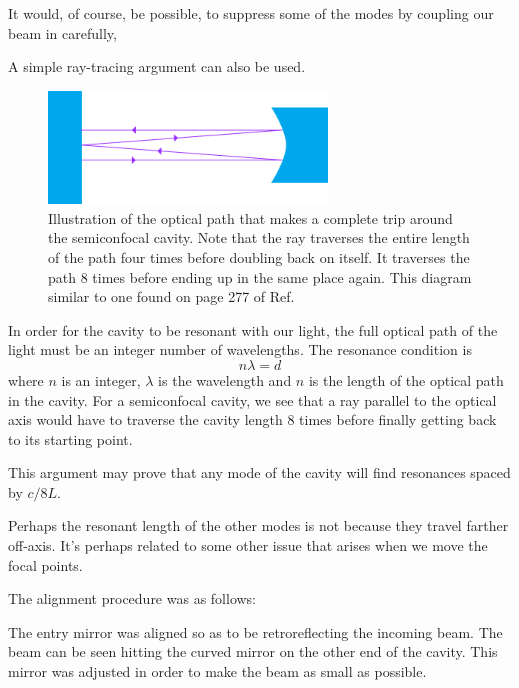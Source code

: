 It would, of course, be possible, to suppress some of the modes by coupling our beam in carefully, 

A simple ray-tracing argument can also be used. 
\begin{figure}
\centerline{\includegraphics[height=3cm]{spectrum_analyzer_path.png}}
\caption{Illustration of the optical path that makes a complete trip around the semiconfocal cavity. Note that the ray traverses the entire length of the path four times before doubling back on itself. It traverses the path 8 times before ending up in the same place again. This diagram similar to one found on page 277 of Ref.\ \cite{lasersMilonniEberly}}
\end{figure}

In order for the cavity to be resonant with our light, the full optical path of the light must be an integer number of wavelengths. The resonance condition is 
\begin{equation}
n \lambda = d
\end{equation}
where $n$ is an integer, $\lambda$ is the wavelength and $n$ is the length of the optical path in the cavity. 
For a semiconfocal cavity, we see that a ray parallel to the optical axis would have to traverse the cavity length 8 times before finally getting back to its starting point. 

This argument may prove that any mode of the cavity will find resonances spaced by $c/8L$.




Perhaps the resonant length of the other modes is not because they travel farther off-axis. It's perhaps related to some other issue that arises when we move the focal points.


The alignment procedure was as follows:

The entry mirror was aligned so as to be retroreflecting the incoming beam. The beam can be seen hitting the curved mirror on the other end of the cavity. This mirror was adjusted in order to make the beam as small as possible. 
